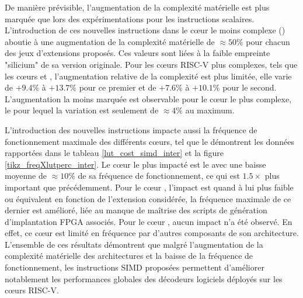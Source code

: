 \documentclass[../main.tex]{subfiles}
\begin{document}
De manière prévisible, l'augmentation de la complexité matérielle est plus marquée que lors des expérimentations pour les instructions scalaires. 
L'introduction de ces nouvelles instructions dans le cœur le moins complexe (\PicoRV) aboutie à une augmentation de la complexité matérielle de $\approx 50\%$ pour chacun des jeux d'extensions proposés. 
Ces valeurs sont liées à la faible empreinte "silicium" de sa version originale. 
Pour les cœurs RISC-V plus complexes, tels que les cœurs \IBEX\space et \SCR, l'augmentation relative de la complexité est plus limitée, elle varie de $+9.4\%$ à $+13.7\%$ pour ce premier et de $+7.6\%$ à $+10.1\%$ pour le second. 
L'augmentation la moins marquée est observable pour le cœur le plus complexe, le \RISCY\space pour lequel la variation est seulement de $\approx 4\%$ au maximum. 

L'introduction des nouvelles instructions impacte aussi la fréquence de fonctionnement maximale des différents cœurs, tel que le démontrent les données rapportées dans le tableau \ref{lut_cost_simd_inter} et la figure \ref{tikz_freqXlutperc_inter}. 
Le cœur le plus impacté est le \PicoRV\space avec une baisse moyenne de $\approx 10\%$ de sa fréquence de fonctionnement, ce qui est $1.5\times$ plus important que précédemment. 
Pour le cœur \IBEX, l'impact est quand à lui plus faible ou équivalent en fonction de l'extension considérée, la fréquence maximale de ce dernier est amélioré, liée au manque de maîtrise des scripts de génération d'implantation FPGA associés. 
Pour le cœur \RISCY, aucun impact n'a été observé. En effet, ce cœur est limité en fréquence par d'autres composants de son architecture. 
L'ensemble de ces résultats démontrent que malgré l'augmentation de la complexité matérielle des architectures et la baisse de la fréquence de fonctionnement, les instructions SIMD proposées permettent d'améliorer notablement les performances globales des décodeurs logiciels déployés sur les cœurs RISC-V.



%
%
%
%
%
%
%
\end{document}
